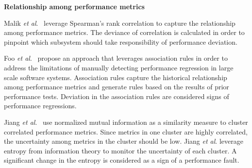 %



\noindent \textbf{Relationship among performance metrics}

Malik \emph{et al$.$}~\cite{5635038} leverage Spearman's rank correlation to capture the relationship among performance metrics. The deviance of correlation is calculated in order to pinpoint which subsystem should take responsibility of performance deviation.

Foo\emph{ et al$.$}~\cite{foo2010mining} propose an approach that leverages association rules in order to address the limitations of manually detecting performance regression in large scale software systems. Association rules capture the historical relationship among performance metrics and generate rules based on the results of prior performance tests. Deviation in the association rules are considered signs of performance regressions.

Jiang \emph{et al$.$}~\cite{5270324} use normalized mutual information as a similarity measure to cluster correlated performance metrics. Since metrics in one cluster are highly correlated, the uncertainty among metrics in the cluster should be low. Jiang \emph{et al$.$} leverage entropy from information theory to monitor the uncertainty of each cluster. A significant change in the entropy is considered as a sign of a performance fault. %



